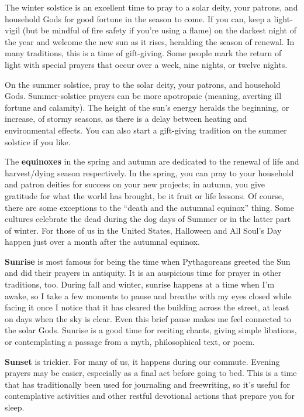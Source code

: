 \documentclass[
]{book}
\begin{document}
The winter solstice is an excellent time to pray to a solar deity, your patrons, and household Gods for good fortune in the season to come. If you can, keep a light-vigil (but be mindful of fire safety if you're using a flame) on the darkest night of the year and welcome the new sun as it rises, heralding the season of renewal. In many traditions, this is a time of gift-giving. Some people mark the return of light with special prayers that occur over a week, nine nights, or twelve nights.

On the summer solstice, pray to the solar deity, your patrons, and household Gods. Summer-solstice prayers can be more apotropaic (meaning, averting ill fortune and calamity). The height of the sun's energy heralds the beginning, or increase, of stormy seasons, as there is a delay between heating and environmental effects. You can also start a gift-giving tradition on the summer solstice if you like.

The \textbf{equinoxes} in the spring and autumn are dedicated to the renewal of life and harvest/dying season respectively. In the spring, you can pray to your household and patron deities for success on your new projects; in autumn, you give gratitude for what the world has brought, be it fruit or life lessons. Of course, there are some exceptions to the ``death and the autumnal equinox'' thing. Some cultures celebrate the dead during the dog days of Summer or in the latter part of winter. For those of us in the United States, Halloween and All Soul's Day happen just over a month after the autumnal equinox.

\textbf{Sunrise} is most famous for being the time when Pythagoreans greeted the Sun and did their prayers in antiquity. It is an auspicious time for prayer in other traditions, too. During fall and winter, sunrise happens at a time when I'm awake, so I take a few moments to pause and breathe with my eyes closed while facing it once I notice that it has cleared the building across the street, at least on days when the sky is clear. Even this brief pause makes me feel connected to the solar Gods. Sunrise is a good time for reciting chants, giving simple libations, or contemplating a passage from a myth, philosophical text, or poem.

\textbf{Sunset} is trickier. For many of us, it happens during our commute. Evening prayers may be easier, especially as a final act before going to bed. This is a time that has traditionally been used for journaling and freewriting, so it's useful for contemplative activities and other restful devotional actions that prepare you for sleep.
\end{document}
